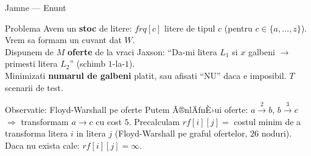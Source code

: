 ﻿\documentclass[9pt]{beamer}
\begin{document}
\begin{frame}[shrink]{Jamne --- Enunt}
  \begin{block}{Problema}
    Avem un \textbf{stoc} de litere: $\mathit{frq}[c]$ litere de tipul $c$
    (pentru $c\in\{a,\ldots,z\}$). Vrem sa formam un cuvant dat $W$.\\
    \smallskip
    Dispunem de $M$ \textbf{oferte} de la vraci Jaxson:
    ``Da-mi litera $L_1$ si $x$ galbeni $\to$ primesti litera $L_2$'' (schimb $1$-la-$1$).\\
    \smallskip
    Minimizati \textbf{numarul de galbeni} platit, sau afisati ``NU'' daca e imposibil.
    $T$ scenarii de test.
  \end{block}
  \begin{exampleblock}{Observatie: Floyd-Warshall pe oferte}
    \footnotesize
    Putem Ã®nlÄƒnÈ›ui oferte: $a\xrightarrow{2}b$, $b\xrightarrow{3}c$
    $\Rightarrow$ transformam $a\to c$ cu cost $5$.
    Precalculam $\mathit{rf}[i][j]=$ costul minim de a transforma
    litera $i$ in litera $j$ (Floyd-Warshall pe graful ofertelor, $26$ noduri).
    Daca nu exista cale: $\mathit{rf}[i][j]=\infty$.
  \end{exampleblock}
\end{frame}
\end{document}
